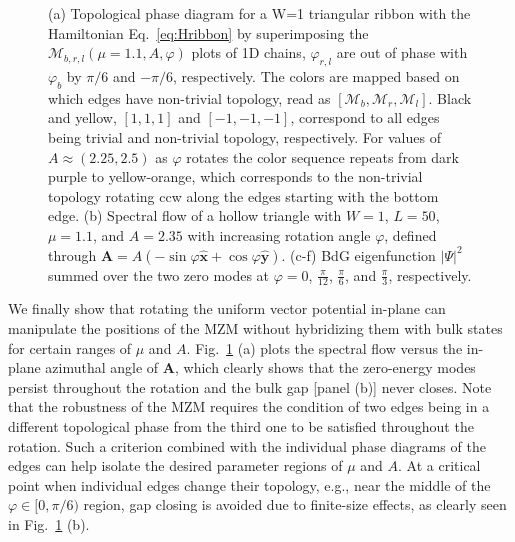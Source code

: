\documentclass[aps,prb,twocolumn,showpacs,amsmath,amssymb,superscriptaddress]{revtex4-2}
\let\oldhat\hat
\renewcommand{\hat}[1]{\oldhat{\mathbf{#1}}}
\begin{document}
\begin{figure}[ht]
  \caption{(a) Topological phase diagram for a W=1 triangular ribbon with the Hamiltonian Eq.~\eqref{eq:Hribbon} by superimposing the $\mathcal{M}_{b,r,l}(\mu=1.1,A,\varphi)$ plots of 1D chains, $\varphi_{r,l}$ are out of phase with $\varphi_b$ by $\pi/6$ and $-\pi/6$, respectively. The colors are mapped based on which edges have non-trivial topology, read as $[\mathcal{M}_b, \mathcal{M}_r, \mathcal{M}_l]$. Black and yellow, $[1,1,1]$ and $[-1,-1,-1]$, correspond to all edges being trivial and non-trivial topology, respectively. For values of $A \approx (2.25,2.5)$ as $\varphi$ rotates the color sequence repeats from dark purple to yellow-orange, which corresponds to the non-trivial topology rotating ccw along the edges starting with the bottom edge. (b) Spectral flow of a hollow triangle with $W=1$, $L=50$, $\mu=1.1$, and $A=2.35$ with increasing rotation angle $\varphi$, defined through $\mathbf A = A(-\sin\varphi \hat{x} + \cos\varphi \hat{y})$. (c-f) BdG eigenfunction $|\Psi|^2$ summed over the two zero modes at $\varphi = 0$, $\frac{\pi}{12}$, $\frac{\pi}{6}$, and $\frac{\pi}{3}$, respectively.}
  \label{fig: rotation}
\end{figure}

We finally show that rotating the uniform vector potential in-plane can manipulate the positions of the MZM without hybridizing them with bulk states for certain ranges of $\mu$ and $A$. Fig.~\ref{fig: rotation} (a) plots the spectral flow versus the in-plane azimuthal angle of $\mathbf A$, which clearly shows that the zero-energy modes persist throughout the rotation and the bulk gap [panel (b)] never closes. Note that the robustness of the MZM requires the condition of two edges being in a different topological phase from the third one to be satisfied throughout the rotation. Such a criterion combined with the individual phase diagrams of the edges can help isolate the desired parameter regions of $\mu$ and $A$. At a critical point when individual edges change their topology, e.g., near the middle of the $\varphi\in [0,\pi/6)$ region, gap closing is avoided due to finite-size effects, as clearly seen in Fig.~\ref{fig: rotation} (b).
\end{document}
